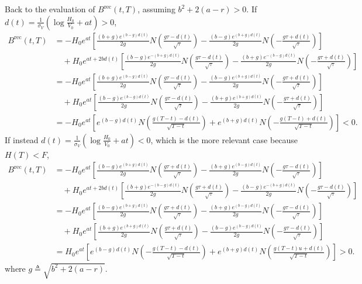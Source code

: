 \documentclass[paper=a4, fontsize=11pt]{scrartcl} %
\numberwithin{equation}{section} %
\numberwithin{figure}{section} %
\numberwithin{table}{section} %
\begin{document}
Back to the evaluation of $B^{\text{rec}}(t, T)$, assuming $b^2+2(a-r)>0$. If $d(t) = \frac{1}{\sigma_V} \left(\log\frac{H_0}{V_0} + at\right)>0$,
\begin{align}
\nonumber B^{\text{rec}}(t, T) &= -H_0e^{at}\left[ \frac{(b+g)e^{ (b- g)d(t)}}{2g} N\left(  \frac{g\tau-d(t)}{\sqrt{\tau}}\right) - \frac{(b-g)e^{ (b+g)d(t)}}{2g} N\left(  -\frac{g\tau+d(t)}{\sqrt{\tau}}\right) \right]\\
\nonumber &\quad +H_0e^{at+2bd(t)}\left[  \frac{(b-g)e^{ -(b+ g)d(t)}}{2g} N\left( \frac{g\tau-d(t)}{\sqrt{\tau}}\right)-\frac{(b+g)e^{ -(b- g)d(t)}}{2g} N\left(  -\frac{g\tau+d(t)}{\sqrt{\tau}}\right) \right]\\
\nonumber  &= -H_0e^{at}\left[ \frac{(b+g)e^{ (b- g)d(t)}}{2g} N\left(  \frac{g\tau-d(t)}{\sqrt{\tau}}\right) - \frac{(b-g)e^{ (b+g)d(t)}}{2g} N\left(  -\frac{g\tau+d(t)}{\sqrt{\tau}}\right) \right]\\
\nonumber &\quad +H_0e^{at}\left[  \frac{(b-g)e^{ (b- g)d(t)}}{2g} N\left( \frac{g\tau-d(t)}{\sqrt{\tau}}\right)-\frac{(b+g)e^{ (b+ g)d(t)}}{2g} N\left(  -\frac{g\tau+d(t)}{\sqrt{\tau}}\right) \right]\\
\nonumber  &= -H_0e^{at}\left[ e^{ (b- g)d(t)} N\left(  \frac{g(T-t)-d(t)}{\sqrt{T-t}}\right) +e^{ (b+g)d(t)} N\left(  -\frac{g(T-t)+d(t)}{\sqrt{T-t}}\right) \right]<0.
\end{align}
If instead $d(t) = \frac{1}{\sigma_V} \left(\log\frac{H_0}{V_0} + at\right)<0$, which is the more relevant case because $H(T)<F$,
\begin{align}
\nonumber B^{\text{rec}}(t, T) &= -H_0e^{at}\left[ \frac{(b-g)e^{ (b+ g)d(t)}}{2g} N\left( \frac{g\tau+d(t)}{\sqrt{\tau}}\right)-\frac{(b+g)e^{ (b- g)d(t)}}{2g} N\left(  -\frac{g\tau-d(t)}{\sqrt{\tau}}\right) \right]\\
\nonumber &\quad +H_0e^{at+2bd(t)}\left[  \frac{(b+g)e^{ -(b- g)d(t)}}{2g} N\left(  \frac{g\tau+d(t)}{\sqrt{\tau}}\right) - \frac{(b-g)e^{ -(b+g)d(t)}}{2g} N\left(  -\frac{g\tau-d(t)}{\sqrt{\tau}}\right) \right]\\
\nonumber &= -H_0e^{at}\left[ \frac{(b-g)e^{ (b+ g)d(t)}}{2g} N\left( \frac{g\tau+d(t)}{\sqrt{\tau}}\right)-\frac{(b+g)e^{ (b- g)d(t)}}{2g} N\left(  -\frac{g\tau-d(t)}{\sqrt{\tau}}\right) \right]\\
\nonumber &\quad +H_0e^{at}\left[  \frac{(b+g)e^{ (b+ g)d(t)}}{2g} N\left(  \frac{g\tau+d(t)}{\sqrt{\tau}}\right) - \frac{(b-g)e^{ (b-g)d(t)}}{2g} N\left(  -\frac{g\tau-d(t)}{\sqrt{\tau}}\right) \right]\\
\nonumber &=H_0e^{at}\left[  e^{ (b-g)d(t)} N\left(  -\frac{g(T-t)-d(t)}{\sqrt{T-t}}\right) +  e^{ (b+ g)d(t)} N\left(  \frac{g(T-t)u+d(t)}{\sqrt{T-t}}\right) \right]>0.
\end{align}
where $g\triangleq \sqrt{b^2+2(a-r)}$.
\end{document}
